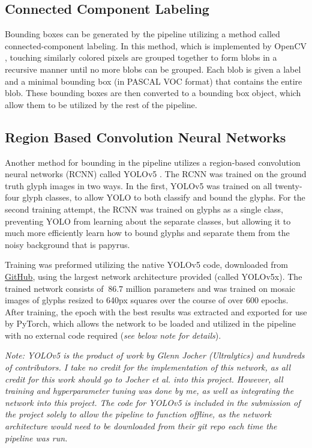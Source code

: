 \subsection{Connected Component Labeling}

Bounding boxes can be generated by the pipeline utilizing a method called connected-component labeling. In this method, which is implemented by OpenCV \cite{OpenCV}, touching similarly colored pixels are grouped together to form blobs in a recursive manner until no more blobs can be grouped. Each blob is given a label and a minimal bounding box (in PASCAL VOC format) that contains the entire blob. These bounding boxes are then converted to a bounding box object, which allow them to be utilized by the rest of the pipeline.

\subsection{Region Based Convolution Neural Networks}

Another method for bounding in the pipeline utilizes a region-based convolution neural networks (RCNN) called YOLOv5 \cite{YOLOv5}. The RCNN was trained on the ground truth glyph images in two ways. In the first, YOLOv5 was trained on all twenty-four glyph classes, to allow YOLO to both classify and bound the glyphs. For the second training attempt, the RCNN was trained on glyphs as a single class, preventing YOLO from learning about the separate classes, but allowing it to much more efficiently learn how to bound glyphs and separate them from the noisy background that is papyrus.

Training was preformed utilizing the native YOLOv5 code, downloaded from \href{https://github.com/ultralytics/yolov5}{GitHub}, using the largest network architecture provided (called YOLOv5x). The trained network consists of $~86.7$ million parameters and was trained on mosaic  images of glyphs resized to 640px squares over the course of over 600 epochs. After training, the epoch with the best results was extracted and exported for use by PyTorch, which allows the network to be loaded and utilized in the pipeline with no external code required (\textit{see below note for details}).

\textit{Note: YOLOv5 is the product of work by Glenn Jocher (Ultralytics) and hundreds of contributors. I take no credit for the implementation of this network, as all credit for this work should go to Jocher et al. into this project. However, all training and hyperparameter tuning was done by me, as well as integrating the network into this project. The code for YOLOv5 is included in the submission of the project solely to allow the pipeline to function offline, as the network architecture would need to be downloaded from their git repo each time the pipeline was run.}

